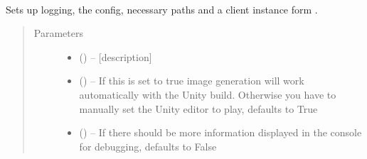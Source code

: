 \documentclass[letterpaper,10pt,english]{sphinxmanual}
\begin{document}
\begin{fulllineitems}
\label{\detokenize{index:dataset.dataset_cuboids}}~

\begin{fulllineitems}
\label{\detokenize{index:dataset.dataset_cuboids.__init__}}
Sets up logging, the config, necessary paths and a client instance form {\hyperref[\detokenize{index:client.client_communicator_to_unity}]{}}.
\begin{quote}\begin{description}
\item[{Parameters}] \leavevmode\begin{itemize}
\item {} 
 (\sphinxstyleliteralemphasis{\sphinxupquote{{[}}}\sphinxstyleliteralemphasis{\sphinxupquote{{]}}}) -- {[}description{]}

\item {} 
 (\sphinxstyleliteralemphasis{\sphinxupquote{, }}) -- If this is set to true image generation will work automatically with the Unity build. Otherwise you have to manually set the Unity editor to play, defaults to True

\item {} 
 (\sphinxstyleliteralemphasis{\sphinxupquote{, }}) -- If there should be more information displayed in the console for debugging, defaults to False

\end{itemize}

\end{description}\end{quote}


\end{fulllineitems}
\end{fulllineitems}
\end{document}
